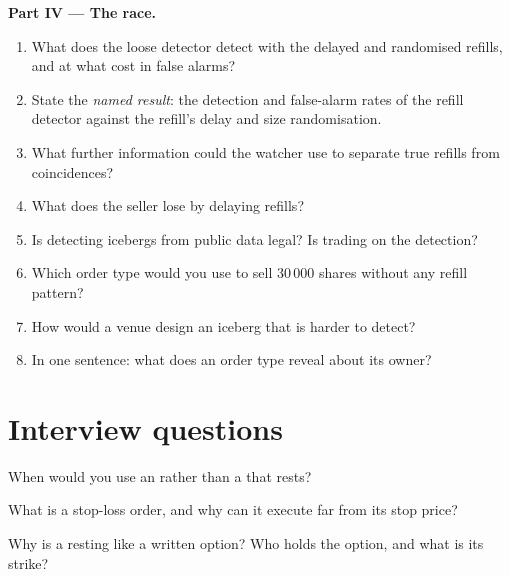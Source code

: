 \begin{problem}
\medskip\noindent\textbf{Part IV --- The race.}
\begin{enumerate}[resume]
\item What does the loose detector detect with the delayed and randomised refills, and at what cost in false alarms?
\item State the \emph{named result}: the detection and false-alarm rates of the refill detector against the refill's delay and size randomisation.
\item What further information could the watcher use to separate true refills from coincidences?
\item What does the seller lose by delaying refills?
\item Is detecting icebergs from public data legal? Is trading on the detection?
\item Which order type would you use to sell 30\,000 shares without any refill pattern?
\item How would a venue design an iceberg that is harder to detect?
\item In one sentence: what does an order type reveal about its owner?
\end{enumerate}
\end{problem}

\section{Interview questions}

\begin{interviewq}\label{iq:mx:order-types-and-their-uses:1}
When would you use an  rather than a  that rests?
\end{interviewq}

\begin{interviewq}\label{iq:mx:order-types-and-their-uses:2}
What is a stop-loss order, and why can it execute far from its stop price?
\end{interviewq}

\begin{interviewq}\label{iq:mx:order-types-and-their-uses:3}
Why is a resting  like a written option? Who holds the option, and what is its strike?
\end{interviewq}

